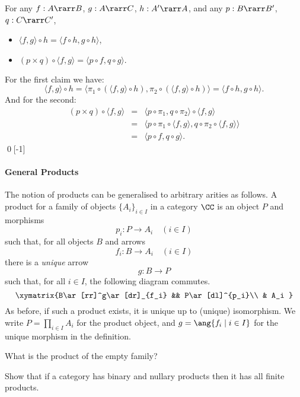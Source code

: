 \documentclass{svmult}
\begin{document}
\begin{myproposition}\label{p:times} For any $f:A\rarr B$, $g:A\rarr C$, $h:A'\rarr A$, and any $p:B\rarr B'$, $q:C\rarr C'$,
\begin{itemize}
    \item $\langle f, g \rangle \circ h = \langle f \circ h, g \circ h \rangle$,
    \item $(p \times q) \circ \langle f, g \rangle = \langle p \circ f, q \circ g \rangle.$
\end{itemize}
\end{myproposition}
\proof For the first claim we have:
\[ \langle f, g \rangle \circ h = \langle \pi_{1} \circ (\langle f, g \rangle \circ h), \pi_{2} \circ (\langle f, g \rangle \circ h) \rangle =
    \langle f \circ h, g \circ h \rangle . \]
And for the second:
\[ \begin{array}{rcl}
(p \times q) \circ \langle f, g \rangle & = & \langle p \circ \pi_{1},  q \circ \pi_{2} \rangle \circ \langle f, g \rangle \\
& = &   \langle p \circ \pi_{1} \circ \langle f, g \rangle,  q \circ \pi_{2}  \circ \langle f, g \rangle \rangle \\
& = &   \langle p \circ f,  q \circ g \rangle .
\end{array}
\]
\qed[-1]




\paragraph{General Products} The notion of products can be generalised to arbitrary arities as follows.
A product for a family of objects $\{A_i \}_{i \in I}$ in a category $\CC$ is an object $P$ and morphisms
\[ p_i : P \longrightarrow A_i \quad (i \in I) \]
such that, for all objects $B$ and arrows
\[ f_i : B \longrightarrow A_i \quad (i \in I) \]
there is a \emph{unique} arrow
\[ g : B \longrightarrow P \]
such that, for all $i \in I$, the following diagram commutes.
\[ \xymatrix{B\ar[rr]^g\ar[dr]_{f_i} && P\ar[dl]^{p_i}\\ & A_i }\]
%
As before, if such a product exists, it is unique up to (unique) isomorphism. We write $P=\prod_{i\in I}A_i$ for the product object, and
$g=\ang{f_i\mid i\in I}$ for the unique morphism in the definition.

\begin{myexercise}
    What is the product of the empty family?
\end{myexercise}
\begin{myexercise}
Show that if a category has binary and nullary products then it has all finite products.
\end{myexercise}
\end{document}
